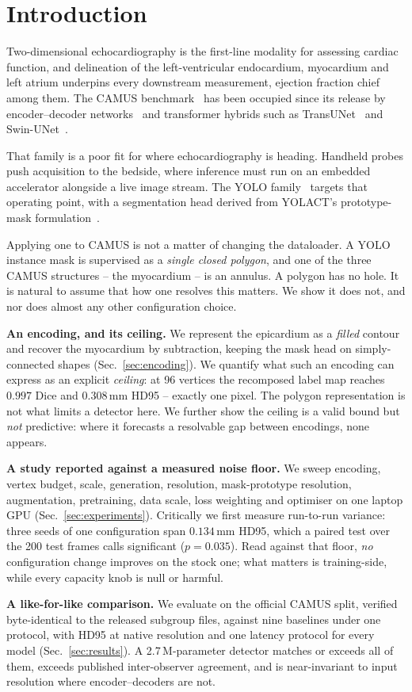 \section{Introduction}

Two-dimensional echocardiography is the first-line modality for assessing
cardiac function, and delineation of the left-ventricular endocardium,
myocardium and left atrium underpins every downstream measurement, ejection
fraction chief among them. The CAMUS benchmark~\cite{leclerc2019camus} has been
occupied since its release by encoder--decoder
networks~\cite{ronneberger2015unet,isensee2021nnunet} and transformer hybrids
such as TransUNet~\cite{chen2021transunet} and Swin-UNet~\cite{cao2022swinunet}.

That family is a poor fit for where echocardiography is heading. Handheld
probes push acquisition to the bedside, where inference must run on an embedded
accelerator alongside a live image stream. The YOLO family~\cite{redmon2016yolo}
targets that operating point, with a segmentation head derived from YOLACT's
prototype-mask formulation~\cite{bolya2019yolact}.

Applying one to CAMUS is not a matter of changing the dataloader. A YOLO
instance mask is supervised as a \emph{single closed polygon}, and one of the
three CAMUS structures -- the myocardium -- is an annulus. A polygon has no
hole. It is natural to assume that how one resolves this matters. We show it
does not, and nor does almost any other configuration choice.

\textbf{An encoding, and its ceiling.} We represent the epicardium as a
\emph{filled} contour and recover the myocardium by subtraction, keeping the
mask head on simply-connected shapes (Sec.~\ref{sec:encoding}). We quantify what
such an encoding can express as an explicit \emph{ceiling}: at 96 vertices the
recomposed label map reaches $0.997$ Dice and $0.308$\,mm HD95 -- exactly one
pixel. The polygon representation is not what limits a detector here. We further
show the ceiling is a valid bound but \emph{not} predictive: where it forecasts
a resolvable gap between encodings, none appears.

\textbf{A study reported against a measured noise floor.} We sweep encoding,
vertex budget, scale, generation, resolution, mask-prototype resolution,
augmentation, pretraining, data scale, loss weighting and optimiser on one
laptop GPU (Sec.~\ref{sec:experiments}). Critically we first measure run-to-run
variance: three seeds of one configuration span $0.134$\,mm HD95, which a paired
test over the 200 test frames calls significant ($p{=}0.035$). Read against that
floor, \emph{no} configuration change improves on the stock one; what matters is
training-side, while every capacity knob is null or harmful.

\textbf{A like-for-like comparison.} We evaluate on the official CAMUS split,
verified byte-identical to the released subgroup files, against nine baselines
under one protocol, with HD95 at native resolution and one latency protocol for
every model (Sec.~\ref{sec:results}). A 2.7\,M-parameter detector matches or
exceeds all of them, exceeds published inter-observer agreement, and is
near-invariant to input resolution where encoder--decoders are not.
